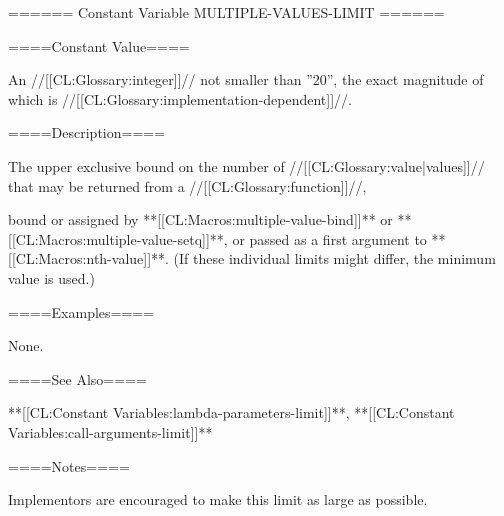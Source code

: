 ====== Constant Variable MULTIPLE-VALUES-LIMIT ======

====Constant Value====

An //[[CL:Glossary:integer]]// not smaller than ''20'', the exact magnitude of which is //[[CL:Glossary:implementation-dependent]]//.

====Description====

The upper exclusive bound on the number of //[[CL:Glossary:value|values]]// that may be returned from a //[[CL:Glossary:function]]//,

bound or assigned by **[[CL:Macros:multiple-value-bind]]** or **[[CL:Macros:multiple-value-setq]]**, or passed as a first argument to **[[CL:Macros:nth-value]]**. (If these individual limits might differ, the minimum value is used.)

====Examples====

None.

====See Also====

**[[CL:Constant Variables:lambda-parameters-limit]]**, **[[CL:Constant Variables:call-arguments-limit]]**

====Notes====

Implementors are encouraged to make this limit as large as possible.

